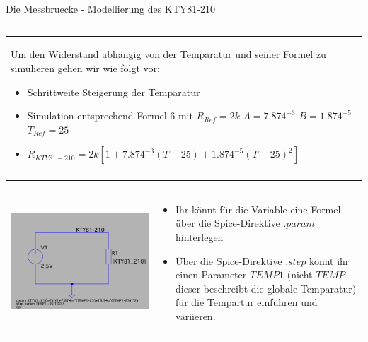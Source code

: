 \begin{frame}[t]{Die Messbruecke - Modellierung des KTY81-210}
\begin{spacing}{0.9}
\begin{tiny}
\begin{table}[h!]
\begin{tabular}{p{3cm} p{7cm}}
        \end{tabular}
        \begin{tabular}{p{10cm}}
            \begin{minipage}{\textwidth}
                Um den Widerstand abhängig von der Temparatur und seiner Formel zu simulieren gehen wir wie folgt vor:
                \begin{itemize}
                    \item Schrittweite Steigerung der Temparatur
                    \item Simulation entsprechend Formel 6 mit $R_{Ref}=2k$ $A=7.874^{-3}$ $B=1.874^{-5}$ $T_{Ref}=25$
                    \item $R_{KTY81-210}=2k[1+7.874^{-3}(T-25)+1.874^{-5}(T-25)^2]$
                \end{itemize}
            \end{minipage}
            \\ \\
        \end{tabular}
        \begin{tabular}{p{3cm} p{7cm}}
            \begin{minipage}{.3\textwidth}
                \includegraphics[width=0.8\linewidth]{pictures/kty81_simulation.png} 
            \end{minipage} 
            &
            \begin{minipage}{.7\textwidth}
                \begin{itemize}
                    \item Ihr könnt für die Variable eine Formel über die Spice-Direktive $.param$ hinterlegen
                    \item Über die Spice-Direktive $.step$ könnt ihr einen Parameter $TEMP1$ (nicht $TEMP$ dieser beschreibt die globale Temparatur) für die Tempartur einführen und variieren.

\end{itemize}
\end{minipage}
\end{tabular}
\end{table}
\end{tiny}
\end{spacing}
\end{frame}
